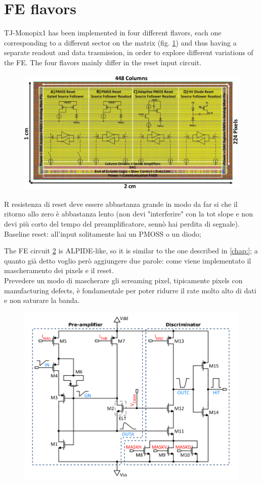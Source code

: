 \section{FE flavors}
    TJ-Monopix1 has been implemented in four different flavors, each one corresponding to a different sector on the matrix (fig. \ref{fig:Monopix1_flavors}) and thus having a separate readout and data trasmission, in order to explore different variations of the FE. The four flavors mainly differ in the reset input circuit.
    \begin{figure}[h!]
        \centering
        \includegraphics[width=.5\linewidth]{figures/Monopix1/Monopix1_flavors.png}
        \caption{}
        \label{fig:Monopix1_flavors}
    \end{figure}
    R resistenza di reset deve essere abbastanza grande in modo da far si che il ritorno allo zero è abbastanza lento (non devi "interferire" con la tot slope e non devi più corto del tempo del preamplificatore, sennò hai perdita di segnale).\\
    Baseline reset: all'input solitamente hai un PMOSS o un diodo;  

    The FE circuit \ref{fig:Monopix1_FE_circuit} is ALPIDE-like, so it is similar to the one described in \ref{chap:}; a quanto già detto voglio però aggiungere due parole: come viene implementato il mascheramento dei pixels e il reset.\\ 
    Prevedere un modo di mascherare gli screaming pixel, tipicamente pixels con manufacturing defects, è fondamentale per poter ridurre il rate molto alto di dati e non saturare la banda. 
    \begin{figure}[h!]
        \centering
        \includegraphics[width=.6\linewidth]{figures/Monopix1/Monopix1_FE_circuit.png}
        \caption{}
        \label{fig:Monopix1_FE_circuit}
    \end{figure}

